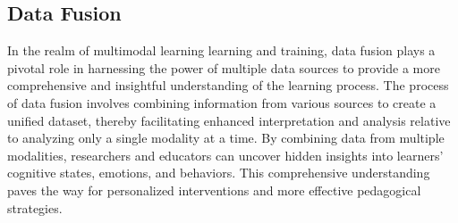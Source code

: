 \documentclass[manuscript,screen,review]{acmart}
\begin{document}
\subsection{Data Fusion} \label{subsec:data_fusion}


In the realm of multimodal learning learning and training, data fusion plays a pivotal role in harnessing the power of multiple data sources to provide a more comprehensive and insightful understanding of the learning process. The process of data fusion involves combining information from various sources to create a unified dataset, thereby facilitating enhanced interpretation and analysis relative to analyzing only a single modality at a time. By combining data from multiple modalities, researchers and educators can uncover hidden insights into learners' cognitive states, emotions, and behaviors. This comprehensive understanding paves the way for personalized interventions and more effective pedagogical strategies. 
\end{document}
